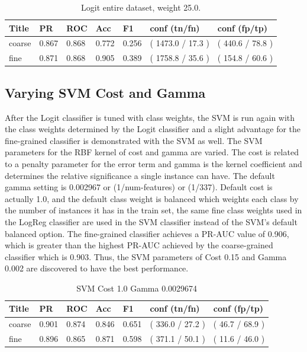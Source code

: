 \documentclass[ms]{nuthesis}
\begin{document}
\FloatBarrier
\begin{table}[H]
\centering
\caption{Logit entire dataset, weight 25.0.}
\label{tab:LogRegAll-Wt25}
\begin{tabular}{|l||l||l||l||l||l||l|}\toprule
Title & PR & ROC & Acc & F1 & conf (tn/fn) & conf (fp/tp) \\ \midrule
coarse & 0.867 & 0.868 & 0.772 & 0.256 & ( 1473.0 / 17.3 ) & ( 440.6 / 78.8 ) \\
fine & 0.871 & 0.868 & 0.905 & 0.389 & ( 1758.8 / 35.6 ) & ( 154.8 / 60.6 ) \\ \bottomrule
\end{tabular}
\end{table}
\FloatBarrier


\subsection{Varying SVM Cost and Gamma}
\label{sect:paramEnd}
\par After the Logit classifier is tuned with class weights, the SVM is run again with the
class weights determined by the Logit classifier and a slight advantage for the fine-grained
classifier is demonstrated with the SVM as well. The SVM parameters for the RBF
kernel of cost and gamma are varied. The cost is related to a penalty parameter for the error term
and gamma is the kernel coefficient and determines the relative significance a single instance can have.
The default gamma setting is 0.002967 or (1/num-features) or (1/337). Default
 cost is actually 1.0, and the default class weight is balanced which weights each class by
 the number of instances it has in the train set, the same fine class weights used in the LogReg
 classifier are used in the SVM classifier instead of the SVM's default balanced option. The fine-grained
  classifier achieves a PR-AUC value of 0.906, which is greater than the highest PR-AUC achieved by
  the coarse-grained classifier which is 0.903. Thus, the SVM parameters of Cost 0.15 and Gamma 0.002
  are discovered to have the best performance.


\FloatBarrier
\begin{table}[H]
\centering
\caption{SVM Cost 1.0 Gamma 0.0029674}
\label{tab:SVM-C1-Gp0029674}
\begin{tabular}{|l||l||l||l||l||l||l|}\toprule
Title & PR & ROC & Acc & F1 & conf (tn/fn) & conf (fp/tp) \\ \midrule
coarse & 0.901 & 0.874 & 0.846 & 0.651 & ( 336.0 / 27.2 ) & ( 46.7 / 68.9 ) \\
fine & 0.896 & 0.865 & 0.871 & 0.598 & ( 371.1 / 50.1 ) & ( 11.6 / 46.0 ) \\ \bottomrule
\end{tabular}
\end{table}
\FloatBarrier
\end{document}
